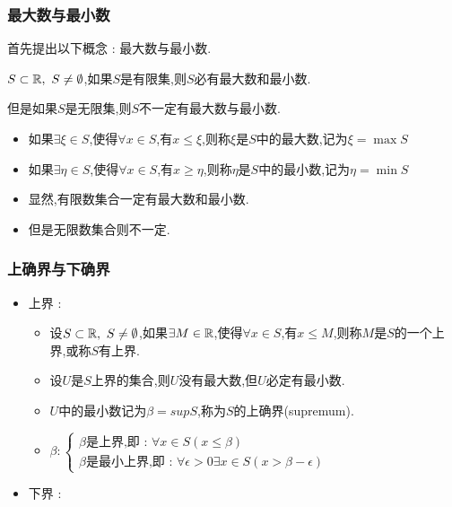 {{{\subsubsection{最大数与最小数}{
    首先提出以下概念 : 最大数与最小数.

    $S \subset \operatorname{\mathbb{R}},\ S \neq \emptyset$,如果$S$是有限集,则$S$必有最大数和最小数.

    但是如果$S$是无限集,则$S$不一定有最大数与最小数.

    \begin{itemize}
        \item 如果$\exists \xi \in S$,使得$\forall x \in S$,有$x \leq \xi$,则称$\xi$是$S$中的最大数,记为$\xi = \max S$
        \item 如果$\exists \eta \in S$,使得$\forall x \in S$,有$x \geq \eta$,则称$\eta$是$S$中的最小数,记为$\eta = \min S$
        \item 显然,有限数集合一定有最大数和最小数.
        \item 但是无限数集合则不一定.
    \end{itemize}
}%

\subsubsection{上确界与下确界}{
    \begin{itemize}
        \item {
              上界 :

              \begin{itemize}
                  \item 设$S \subset \operatorname{\mathbb{R}},\ S \neq \emptyset$,如果$\exists M \in \operatorname{\mathbb{R}}$,使得$\forall x \in S$,有$x \leq M$,则称$M$是$S$的一个上界,或称$S$有上界.
                  \item 设$U$是$S$上界的集合,则$U$没有最大数,但$U$必定有最小数.
                  \item $U$中的最小数记为$\beta = sup S$,称为$S$的上确界(supremum).
                  \item {
                        \(
                        \beta : \begin{cases}
                            \beta\mbox{是上界,即 : }\forall x \in S(x \leq \beta) \\
                            \beta\mbox{是最小上界,即 : }\forall \epsilon > 0 \exists x \in S (x > \beta - \epsilon)
                        \end{cases}
                        \)
                        }
              \end{itemize}
              }
        \item {
              下界 :

}
\end{itemize}}}}}
